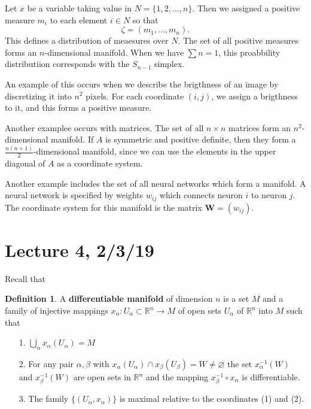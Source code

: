 \documentclass[12pt,letterpaper,boxed]{maths_v5}
\newcommand{\rr}{\mathbb{R}}
\theoremstyle{definition}
\newtheorem{definition}{Definition}[section]
\begin{document}
    Let $x$ be a variable taking value in $N = \{1,2,\dots, n\}$. Then we assigned a positive 
    measure $m_i$ to each element $i \in N$ so that 
    \[
        \zeta= (m_1, \dots, m_n).
    \]
    This defines a distribution of meaesures over $N$. The set of all positive measures forms 
    an $n$-dimensional manifold. When we have $\sum  n = 1$, this proabbility distributiion corresponds 
    with the $S_{n-1}$ simplex. 

    An example of this occurs when we describe the brigthness of an image by discretizing 
    it into $n^2$ pixels. For each coordinate $(i, j)$, we assign a brigthness to it, 
    and this forms a positive measure. 

    Another examplee occurs with matrices. 
    The set of all $n \times n$ matrices form an $n^2$-dimensional manifold.  
    If $A$ is symmetric and positive definite, then they form a $\frac{n(n+1)}{2}$-dimensional 
    manifold,
    since we can use the elements in the upper diagonal of $A$ as a coordinate 
    system. 

    Another example includes the set of all neural networks which form a manifold. 
    A neural network is specified by weights $w_{ij}$ which connects neuron $i$ to neuron $j$. 
    The coordinate system for this manifold is the matrix $\bm{W} = (w_{ij})$. 


    \section*{Lecture 4, 2/3/19}
    Recall that  
    \begin{definition}
        A \textbf{differentiable manifold} of dimension $n$ is a set $M$ 
        and a family of injective mappings $x_\alpha: U_\alpha \subset \rr^n \to M$ 
        of open sets $U_\alpha$ of $\rr^n$ into $M$ such that 
        \begin{itemize}
            \item[1.] $\displaystyle \bigcup_{\alpha} x_\alpha(U_\alpha) = M$ 
            \item[2.] For any pair $\alpha, \beta$ with $x_\alpha(U_\alpha) \cap x_\beta(U_\beta) = W \ne \varnothing$ 
            the set $x_\alpha^{-1}(W)$ and $x_\beta^{-1}(W)$ are open sets in $\rr^n$ 
            and the mapping $x_\beta^{-1}\circ x_\alpha$ is differentiable. 

            \item[3.] The family $\{(U_\alpha, x_\alpha)\}$ is maximal relative 
            to the coordinates (1) and (2).  
        \end{itemize}
    \end{definition}
\end{document}
